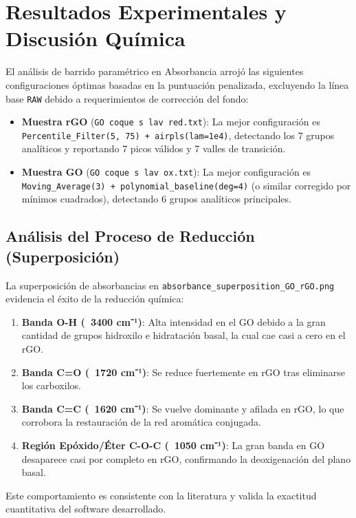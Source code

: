 \documentclass[a4paper,11pt]{article}
\begin{document}
\section{Resultados Experimentales y Discusión Química}
El análisis de barrido paramétrico en Absorbancia arrojó las siguientes configuraciones óptimas basadas en la puntuación penalizada, excluyendo la línea base \texttt{RAW} debido a requerimientos de corrección del fondo:
\begin{itemize}
    \item \textbf{Muestra rGO} (\texttt{GO coque s lav red.txt}): La mejor configuración es \texttt{Percentile\_Filter(5, 75) + airpls(lam=1e4)}, detectando los 7 grupos analíticos y reportando 7 picos válidos y 7 valles de transición.
    \item \textbf{Muestra GO} (\texttt{GO coque s lav ox.txt}): La mejor configuración es \texttt{Moving\_Average(3) + polynomial\_baseline(deg=4)} (o similar corregido por mínimos cuadrados), detectando 6 grupos analíticos principales.
\end{itemize}

\subsection{Análisis del Proceso de Reducción (Superposición)}
La superposición de absorbancias en \texttt{absorbance\_superposition\_GO\_rGO.png} evidencia el éxito de la reducción química:
\begin{enumerate}
    \item \textbf{Banda O-H (~3400 cm⁻¹)}: Alta intensidad en el GO debido a la gran cantidad de grupos hidroxilo e hidratación basal, la cual cae casi a cero en el rGO.
    \item \textbf{Banda C=O (~1720 cm⁻¹)}: Se reduce fuertemente en rGO tras eliminarse los carboxilos.
    \item \textbf{Banda C=C (~1620 cm⁻¹)}: Se vuelve dominante y afilada en rGO, lo que corrobora la restauración de la red aromática conjugada.
    \item \textbf{Región Epóxido/Éter C-O-C (~1050 cm⁻¹)}: La gran banda en GO desaparece casi por completo en rGO, confirmando la deoxigenación del plano basal.
\end{enumerate}

Este comportamiento es consistente con la literatura \cite{silva2021} y valida la exactitud cuantitativa del software desarrollado.
\end{document}
